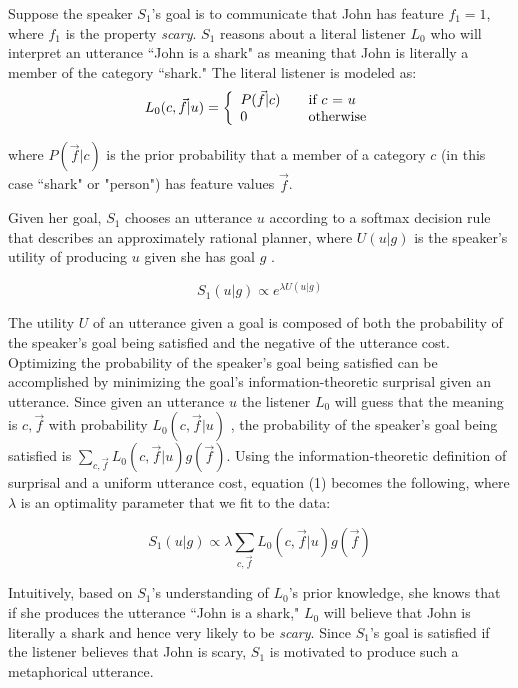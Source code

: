 \documentclass[10pt,letterpaper]{article}
\begin{document}
Suppose the speaker $S_1$'s goal is to communicate that John has feature $f_1 =1$, where $f_1$ is the property \emph{scary}. $S_1$ reasons about a literal listener $L_0$ who will interpret an utterance ``John is a shark" as meaning that John is literally a member of the category ``shark." The literal listener is modeled as:
\[ L_0(c, \vec f |u) = \left\{ 
  \begin{array}{l l}
    P(\vec f | c) & \quad \text{if $c$ = $u$}\\
    0 & \quad \text{otherwise}
  \end{array} \right.\]

where $P(\vec f | c)$ is the prior probability that a member of a category $c$ (in this case ``shark" or "person") has feature values $\vec f$.

Given her goal, $S_1$ chooses an utterance $u$ according to a softmax decision rule that describes an approximately rational planner, where $U(u | g) $ is the speaker's utility of producing $u$ given she has goal $g$ \cite{sutton1998reinforcement}.

\begin{equation}
S_1(u | g) \propto e^{\lambda U(u |  g)}
\end{equation}

The utility $U$ of an utterance given a goal is composed of both the probability of the speaker's goal being satisfied and the negative of the utterance cost. Optimizing the probability of the speaker's goal being satisfied can be accomplished by minimizing the goal's information-theoretic surprisal given an utterance. Since given an utterance $u$ the listener $L_0$ will guess that the meaning is $c, \vec f$ with probability $L_0 (c, \vec f|u)$ , the probability of the speaker's goal being satisfied is $
\sum_{c, \vec f}{L_0 (c, \vec f|u) g(\vec f)}$. Using the information-theoretic definition of surprisal and a uniform utterance cost, equation (1) becomes the following, where $\lambda$ is an optimality parameter that we fit to the data:

\begin{equation}
S_1 (u | g) \propto \lambda \sum_{c,\vec f}{L_0 (c,\vec f|u) g(\vec f)}
\end{equation}

Intuitively, based on $S_1$'s understanding of $L_0$'s prior knowledge, she knows that if she produces the utterance ``John is a shark," $L_0$ will believe that John is literally a shark and hence very likely to be \emph{scary}. Since $S_1$'s goal is satisfied if the listener believes that John is scary, $S_1$ is motivated to produce such a metaphorical utterance. %
\end{document}
